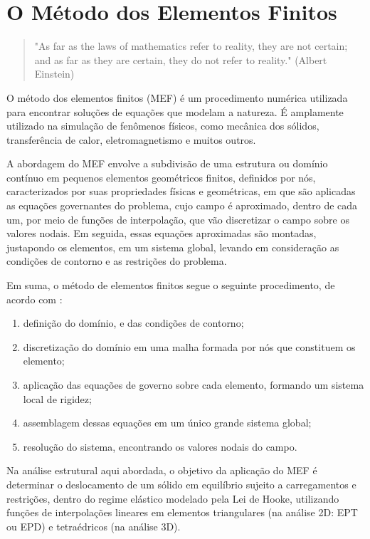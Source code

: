 \chapter{O Método dos Elementos Finitos}

\begin{quote}
    "As far as the laws of mathematics refer to reality, they are not certain; and as far as they are certain, they do not refer to reality." (Albert Einstein)
\end{quote}

O método dos elementos finitos (MEF) é um procedimento numérica utilizada para encontrar soluções de equações que modelam a natureza. É amplamente utilizado na simulação de fenômenos físicos, como mecânica dos sólidos, transferência de calor, eletromagnetismo e muitos outros. \cite{Onate}

A abordagem do MEF envolve a subdivisão de uma estrutura ou domínio contínuo em pequenos elementos geométricos finitos, definidos por nós, caracterizados por suas propriedades físicas e geométricas, em que são aplicadas as equações governantes do problema, cujo campo é aproximado, dentro de cada um, por meio de funções de interpolação, que vão discretizar o campo sobre os valores nodais. Em seguida, essas equações aproximadas são montadas, justapondo os elementos, em um sistema global, levando em consideração as condições de contorno e as restrições do problema. \cite{LIU}

Em suma, o método de elementos finitos segue o seguinte procedimento, de acordo com :

\begin{enumerate}
    \item definição do domínio, e das condições de contorno;
    \item discretização do domínio em uma malha formada por nós que constituem os elemento;
    \item aplicação das equações de governo sobre cada elemento, formando um sistema local de rigidez;
    \item assemblagem dessas equações em um único grande sistema global;
    \item resolução do sistema, encontrando os valores nodais do campo.
\end{enumerate}

Na análise estrutural aqui abordada, o objetivo da aplicação do MEF é determinar o deslocamento de um sólido em equilíbrio sujeito a carregamentos e restrições, dentro do regime elástico modelado pela Lei de Hooke, utilizando funções de interpolações lineares em elementos triangulares (na análise 2D: EPT ou EPD) e tetraédricos (na análise 3D). 


